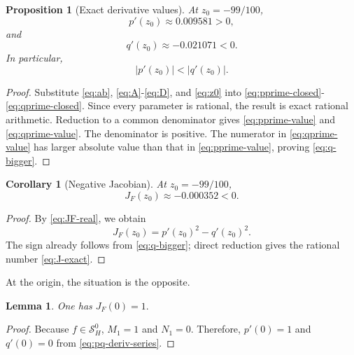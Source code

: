 \documentclass[11pt,reqno]{amsart}
\numberwithin{equation}{section}
\newtheorem{proposition}[theorem]{Proposition}
\newtheorem{lemma}[theorem]{Lemma}
\newtheorem{corollary}[theorem]{Corollary}
\theoremstyle{definition}
\theoremstyle{remark}
\newcommand{\SHZ}{\mathcal S_H^0}
\newcommand{\Jac}{J}
\begin{document}
\begin{proposition}[Exact derivative values]\label{prop:derivative-values}
At $z_0=-99/100$,
\begin{equation}\label{eq:pprime-value}
 p'(z_0)
 \approx 0.009581>0,
\end{equation}
and
\begin{equation}\label{eq:qprime-value}
 q'(z_0)
 \approx -0.021071<0.
\end{equation}
In particular,
\begin{equation}\label{eq:q-bigger}
 |p'(z_0)|<|q'(z_0)|.
\end{equation}
\end{proposition}

\begin{proof}
Substitute \eqref{eq:ab}, \eqref{eq:A}-\eqref{eq:D}, and \eqref{eq:z0} into \eqref{eq:pprime-closed}-\eqref{eq:qprime-closed}.  Since every parameter is rational, the result is exact rational arithmetic.  Reduction to a common denominator gives \eqref{eq:pprime-value} and \eqref{eq:qprime-value}.  The denominator is positive.  The numerator in \eqref{eq:qprime-value} has larger absolute value than that in \eqref{eq:pprime-value}, proving \eqref{eq:q-bigger}. 
\end{proof}

\begin{corollary}[Negative Jacobian]\label{cor:negative-J}
At $z_0=-99/100$,
\begin{equation}\label{eq:J-exact}
 \Jac_F(z_0)
 \approx {-0.000352}<0.
\end{equation}
\end{corollary}

\begin{proof}
By \eqref{eq:JF-real}, we obtain
\[
 \Jac_F(z_0)=p'(z_0)^2-q'(z_0)^2.
\]
The sign already follows from \eqref{eq:q-bigger}; direct reduction gives the rational number \eqref{eq:J-exact}.
\end{proof}

At the origin, the situation is the opposite.

\begin{lemma}\label{lem:J0}
One has
\(
 \Jac_F(0)=1.\)
\end{lemma}

\begin{proof}
Because $f\in\SHZ$, $M_1=1$ and $N_1=0$.  Therefore, $p'(0)=1$ and $q'(0)=0$ from \eqref{eq:pq-deriv-series}.
\end{proof}
\end{document}
